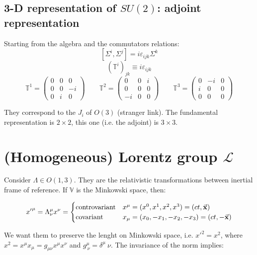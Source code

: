 \documentclass[../../main/main.tex]{subfiles}
\begin{document}
\subsection{3-D representation of \( SU(2) \): adjoint representation}
Starting from the algebra and the commutators relations:
\[
    [\Sigma ^i, \Sigma ^j] = i \varepsilon _{ijk} \Sigma ^k
\]
\[
    (\mathbb{T}^i)_{jk} \equiv i \varepsilon _{ijk}
\]
\[
    \mathbb{T}^1 =
	\begin{pmatrix}
	0   & 0  & 0 \\
	0   & 0  & -i \\
	0   & i  & 0
	\end{pmatrix}
	\qquad
	\mathbb{T}^2 =
	\begin{pmatrix}
	0   & 0  & i \\
	0   & 0  & 0 \\
	-i   & 0  & 0
	\end{pmatrix}
	\qquad
	\mathbb{T}^3 =
	\begin{pmatrix}
	0   & -i  & 0 \\
	i   & 0  & 0 \\
	0   & 0  & 0
	\end{pmatrix}
\]

They correspond to the \( J_i \) of \( O(3) \) (stranger link). The fundamental representation is \( 2 \times 2 \), this one (i.e. the adjoint) is \( 3 \times 3 \).





\section{(Homogeneous) Lorentz group \(\mathcal{L}\)}
Consider \( \Lambda \in O(1,3) \). They are the relativistic transformations between inertial frame of reference. If \( \mathbb{V} \) is the Minkowski space, then:

\begin{equation}
{x'}^{\mu} = \Lambda ^{\mu}_{\nu} x^{\nu} =
  \begin{cases}
	  \text{controvariant}	&	x^{\mu} = (x^0,x^1,x^2,x^3) = (ct, \va{x}) \\
	  \text{covariant}	&	x_{\mu} = (x_0,-x_1,-x_2,-x_3) = (ct, -\va{x} )
  \end{cases}
\label{eq:}
\end{equation}

We want them to preserve the lenght on Minkowski space, i.e. \( {x'}^2 = x^2 \), where \( x^2 = x^{\mu}x_{\mu} = g_{\mu \nu} x^{\mu} x^{\nu} \) and \( g^{\mu}_{\ \nu} = \delta ^{\mu}{\ \nu} \). The invariance of the norm implies:
\end{document}
